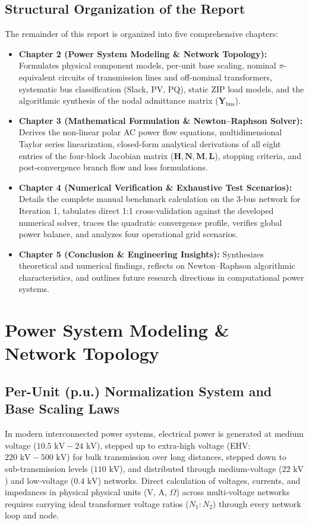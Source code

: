 \documentclass[12pt,a4paper,oneside]{report}
\begin{document}
\section{Structural Organization of the Report}
The remainder of this report is organized into five comprehensive chapters:
\begin{itemize}
    \item \textbf{Chapter 2 (Power System Modeling \& Network Topology):} Formulates physical component models, per-unit base scaling, nominal $\pi$-equivalent circuits of transmission lines and off-nominal transformers, systematic bus classification (Slack, PV, PQ), static ZIP load models, and the algorithmic synthesis of the nodal admittance matrix ($\mathbf{Y}_{\text{bus}}$).
    \item \textbf{Chapter 3 (Mathematical Formulation \& Newton--Raphson Solver):} Derives the non-linear polar AC power flow equations, multidimensional Taylor series linearization, closed-form analytical derivations of all eight entries of the four-block Jacobian matrix ($\mathbf{H}, \mathbf{N}, \mathbf{M}, \mathbf{L}$), stopping criteria, and post-convergence branch flow and loss formulations.
    \item \textbf{Chapter 4 (Numerical Verification \& Exhaustive Test Scenarios):} Details the complete manual benchmark calculation on the 3-bus network for Iteration 1, tabulates direct 1:1 cross-validation against the developed numerical solver, traces the quadratic convergence profile, verifies global power balance, and analyzes four operational grid scenarios.
    \item \textbf{Chapter 5 (Conclusion \& Engineering Insights):} Synthesizes theoretical and numerical findings, reflects on Newton--Raphson algorithmic characteristics, and outlines future research directions in computational power systems.
\end{itemize}

\chapter{Power System Modeling \& Network Topology}

\section{Per-Unit (p.u.) Normalization System and Base Scaling Laws}
In modern interconnected power systems, electrical power is generated at medium voltage ($10.5\text{ kV} - 24\text{ kV}$), stepped up to extra-high voltage (EHV: $220\text{ kV} - 500\text{ kV}$) for bulk transmission over long distances, stepped down to sub-transmission levels ($110\text{ kV}$), and distributed through medium-voltage ($22\text{ kV}$) and low-voltage ($0.4\text{ kV}$) networks. Direct calculation of voltages, currents, and impedances in physical physical units (V, A, $\Omega$) across multi-voltage networks requires carrying ideal transformer voltage ratios ($N_1 : N_2$) through every network loop and node.
\end{document}

